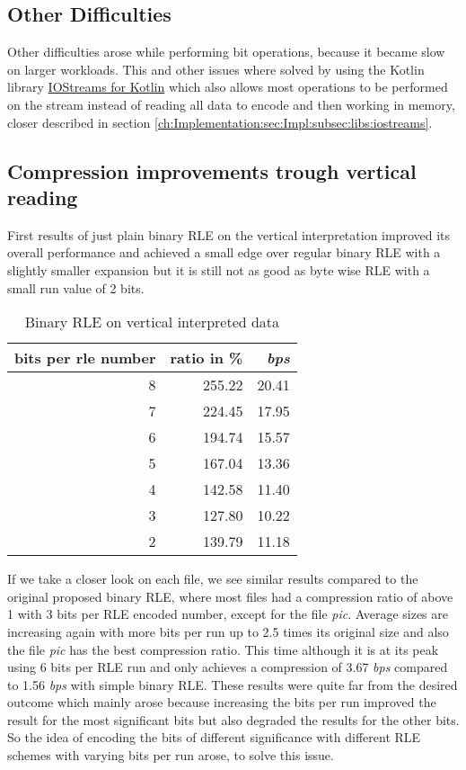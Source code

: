 \subsection{Other Difficulties}
\par{
Other difficulties arose while performing bit operations, because it became slow on larger workloads. This and other issues where solved by using the Kotlin library  \href{https://discuss.kotlinlang.org/t/i-o-streams-for-kotlin/9802}{IOStreams for Kotlin}} which also allows most operations to be performed on the stream instead of reading all data to encode and then working in memory, closer described in section \ref{ch:Implementation:sec:Impl:subsec:libs:iostreams}.

\subsection{Compression improvements trough vertical reading}
\par{
First results of just plain binary RLE on the vertical interpretation improved its overall performance and achieved a small edge over regular binary RLE with a slightly smaller expansion but it is still not as good as byte wise RLE with a small run value of 2 bits.
\begin{table}[H]
	\centering
	\begin{tabular}{r|r|r}	
		bits per rle number & ratio in \% & \textit{bps}\\
		\hline
		8 & 255.22 & 20.41\\
		7 & 224.45 & 17.95\\
		6 & 194.74 & 15.57\\
		5 & 167.04 & 13.36\\
		4 & 142.58 & 11.40\\
		3 & 127.80 & 10.22\\
		2 & 139.79 & 11.18 \\
	\end{tabular}
	\caption{Binary RLE on vertical interpreted data}
	\label{tab:t30 binary RLE on vertical interpreted data}
\end{table}
}

\par{
If we take a closer look on each file, we see similar results compared to the original proposed binary RLE, where most files had a compression ratio of above 1 with 3 bits per RLE encoded number, except for the file \textit{pic}. Average sizes are increasing again with more bits per run up to 2.5 times its original size and also the file \textit{pic} has the best compression ratio. This time although it is at its peak using 6 bits per RLE run and only achieves a compression of 3.67 \textit{bps} compared to 1.56 \textit{bps} with simple binary RLE. These results were quite far from the desired outcome which mainly arose because increasing the bits per run improved the result for the most significant bits but also degraded the results for the other bits. So the idea of encoding the bits of different significance with different RLE schemes with varying bits per run arose, to solve this issue.  
}

